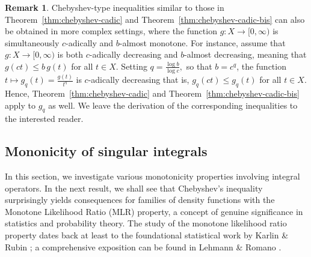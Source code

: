 \documentclass[12pt, reqno]{amsart}%
\theoremstyle{plain}  %
\theoremstyle{definition}  %
\newtheorem{remark}[theorem]{Remark}   %
\theoremstyle{remark}
\numberwithin{equation}{section}
\begin{document}
\begin{remark}
Chebyshev-type inequalities similar to those in Theorem~\ref{thm:chebyshev-cadic} and Theorem~\ref{thm:chebyshev-cadic-bis} can also be obtained in more complex settings, where the function $g:X\to[0,\infty)$ is simultaneously $c$-adically and $b$-almost monotone.
For instance, assume that $g:X\to[0,\infty)$ is both $c$-adically decreasing and $b$-almost decreasing, meaning that
$g(ct)\leq b\,g(t)$  for all $t\in X.$
Setting $q=\frac{\log b}{\log c},$
so that $b=c^{q}$, the function $t\mapsto g_q(t)=\frac{g(t)}{t^{q}}$
is $c$-adically decreasing that is, $g_q(ct)\leq g_q(t)$  for all $t\in X.$ Hence, Theorem~\ref{thm:chebyshev-cadic} and Theorem~\ref{thm:chebyshev-cadic-bis} apply to $g_q$ as well. We leave the derivation of the corresponding inequalities to the interested reader.
\end{remark}


\subsection{Mononicity of singular integrals}
\label{subsec:singular-integral}
In this section, we investigate various monotonicity properties involving integral operators. In the next result, we shall see that Chebyshev's inequality surprisingly yields consequences for families of density functions with the Monotone Likelihood Ratio (MLR) property, a concept of genuine significance in statistics and probability theory.  The study of the monotone likelihood ratio property dates back at least to the foundational statistical work by Karlin \& Rubin \cite{KaRu56}; a comprehensive exposition can be found in Lehmann \& Romano \cite{LeRo21}.
\end{document}
